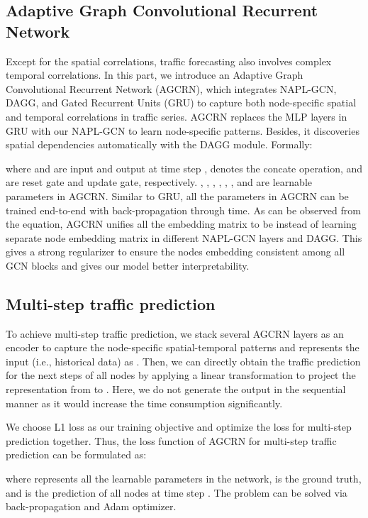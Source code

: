 \documentclass{article}
\begin{document}
\subsection{Adaptive Graph Convolutional Recurrent Network}
Except for the spatial correlations, traffic forecasting also involves complex temporal correlations. In this part, we introduce an Adaptive Graph Convolutional Recurrent Network (AGCRN), which integrates NAPL-GCN, DAGG, and Gated Recurrent Units (GRU) to capture both node-specific spatial and temporal correlations in traffic series. AGCRN replaces the MLP layers in GRU with our NAPL-GCN to learn node-specific patterns. Besides, it discoveries spatial dependencies automatically with the DAGG module. 
Formally: 


where  and  are input and output at time step ,  denotes the concate operation,  and  are reset gate and update gate, respectively. , , , , , , and  are learnable parameters in AGCRN. Similar to GRU, all the parameters in AGCRN can be trained end-to-end with back-propagation through time.
As can be observed from the equation, AGCRN unifies all the embedding matrix to be  instead of learning separate node embedding matrix in different NAPL-GCN layers and DAGG. This gives a strong regularizer to ensure the nodes embedding consistent among all GCN blocks and gives our model better interpretability. 

\subsection{Multi-step traffic prediction}
To achieve multi-step traffic prediction, we stack several AGCRN layers as an encoder to capture the node-specific spatial-temporal patterns and represents the input (i.e., historical data) as .  Then, we can directly obtain the traffic prediction for the next  steps of all nodes by applying a linear transformation to project the representation from  to . Here, we do not generate the output in the sequential manner as it would increase the time consumption significantly. 

We choose L1 loss as our training objective and optimize the loss for multi-step prediction together. Thus, the loss function of AGCRN for multi-step traffic
prediction can be formulated as:

where  represents all the learnable parameters in the network,  is the ground truth, and  is the prediction of all nodes at time step . The problem can be solved via back-propagation and Adam optimizer.
\end{document}
